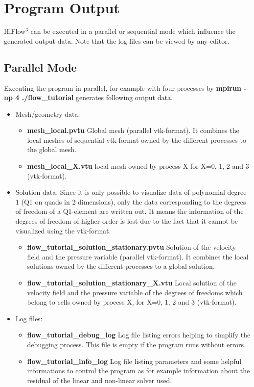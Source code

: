 \documentclass[a4paper, 11pt, twoside]{article}
\begin{document}
\section{Program Output}
HiFlow$^3$ can be executed in a parallel or sequential mode which influence the generated output data. Note that the log files can be viewed by any editor.
\subsection{Parallel Mode}
Executing the program in parallel, for example with four processes by \textbf{mpirun -np 4 ./flow\_tutorial}   
generates following output data. 
\begin{itemize}
\item Mesh/geometry data:
\begin{itemize}
\item \textbf{mesh\_local.pvtu} Global mesh (parallel vtk-format). It combines the local meshes of sequential vtk-format owned by the different processes to the global mesh.
\item \textbf{mesh\_local\_X.vtu} local mesh owned by process X for X=0, 1, 2 and 3 (vtk-format).
\end{itemize}
\item Solution data. Since it is only possible to visualize data of polynomial degree 1 (Q1 on quads in 2 dimensions), 
only the data corresponding to the degrees of freedom of a Q1-element are written out. 
It means the information of the degrees of freedom of higher order is lost due to the fact that it cannot be visualized using the vtk-format.
\begin{itemize}
\item \textbf{flow\_tutorial\_solution\_stationary.pvtu} Solution of the velocity field and the pressure variable (parallel vtk-format). It combines the local solutions owned by the different processes to a global solution.
\item \textbf{flow\_tutorial\_solution\_stationary\_X.vtu} Local solution of the velocity field and the pressure variable of the degrees of freedoms which belong to cells owned by process X, for X=0, 1, 2 and 3 (vtk-format).
\end{itemize}
\item Log files:
\begin{itemize}
\item \textbf{flow\_tutorial\_debug\_log} Log file listing errors helping to simplify the debugging process. This file is empty if the program runs without errors.
\item \textbf{flow\_tutorial\_info\_log} Log file listing parameters and some helpful informations to control 
      the program as for example information about the residual of the linear and non-linear solver used.
\end{itemize}
\end{itemize}
\end{document}
